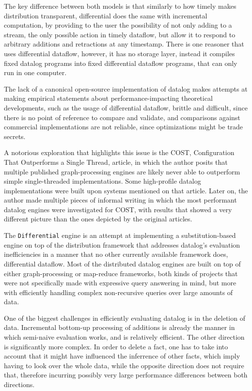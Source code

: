 \documentclass[sigconf,screen,review,natbib]{acmart}
\theoremstyle{definition}
\begin{document}
The key difference between both models is that similarly to how timely makes distribution
transparent, differential does the same with incremental computation, by providing to the user the
possibility of not only adding to a stream, the only possible action in timely dataflow, but
allow it to respond to arbitrary additions and retractions at any timestamp.  There is one
reasoner that uses differential dataflow\cite{ddlog}, however, it has no storage layer, instead
it compiles fixed datalog programs into fixed differential dataflow programs, that can only run in one computer.

The lack of a canonical open-source implementation of datalog makes attempts at making
empirical statements about performance-impacting theoretical developments, such as the usage of
differential dataflow, brittle and difficult, since there is no point of reference to
compare and validate, and comparisons against commercial implementations are not
reliable, since optimizations might be trade secrets.

A notorious exploration that highlights this issue is the COST, Configuration That Outperforms
a Single Thread, article\cite{COST}, in which the author posits that multiple published
graph-processing engines are likely never able to outperform simple single-threaded implementations.
Some high-profile datalog implementations were built upon systems mentioned on that article.
Later on, the author made multiple pieces of informal writing in which the most performant datalog
engines were investigated for COST\cite{blogdynamicdatalog, blogvldbsigmod}, with results that
showed a very different picture than the ones depicted by the original articles.

The \verb|Differential| engine is an attempt at implementing a substitution-based engine on top of the distribution framework that addresses datalog's
evaluation inefficiencies in a manner that no other currently available framework does, differential dataflow\cite{dd}. Most of the distributed datalog engines are
built on top of either graph-processing or map-reduce frameworks, both kinds of projects that were not specifically made with expressive query answering in mind, but
more with efficiently handling complex non-recursive queries over large amounts of data.

One of the biggest challenges in efficiently evaluating datalog is in the deletion of data. Incremental bottom-up processing of additions is already the
manner in which semi-naive evaluation works, and is relatively efficient. The other direction is significantly more complex. In order to delete a fact,
one has to take into account that it might have influenced the inferrence of other facts, which imply having to look over the whole data, while the opposite
direction does not require that, therefore incurring possibly very large performance differences between both directions.
\end{document}
